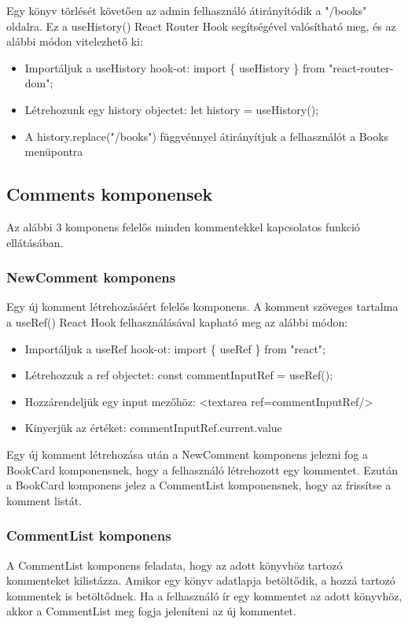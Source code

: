 \bigskip

Egy könyv törlését követően az admin felhasználó átirányítódik a "/books" oldalra. Ez a useHistory() React Router Hook segítségével valósítható meg, és az alábbi módon vitelezhető ki:
\begin{itemize}
    \item Importáljuk a useHistory hook-ot: import \{ useHistory \} from "react-router-dom";
    \item Létrehozunk egy history objectet: let history = useHistory();
    \item A history.replace("/books") függvénnyel átirányítjuk a felhasználót a Books menüpontra
\end{itemize}

\subsection{Comments komponensek}
Az alábbi 3 komponens felelős minden kommentekkel kapcsolatos funkció ellátásában.

\subsubsection{NewComment komponens}
Egy új komment létrehozásáért felelős komponens. A komment szöveges tartalma a useRef() React Hook felhasználásával kapható meg az alábbi módon:
\begin{itemize}
    \item Importáljuk a useRef hook-ot: import \{ useRef \} from "react";
    \item Létrehozzuk a ref objectet: const commentInputRef = useRef();
    \item Hozzárendeljük egy input mezőhöz: <textarea ref={commentInputRef}/>
    \item Kinyerjük az értéket: commentInputRef.current.value
\end{itemize}

Egy új komment létrehozása után a NewComment komponens jelezni fog a BookCard komponensnek, hogy a felhasználó létrehozott egy kommentet. Ezután a BookCard komponens jelez a CommentList komponensnek, hogy az frissítse a komment listát.


\subsubsection{CommentList komponens}
A CommentList komponens feladata, hogy az adott könyvhöz tartozó kommenteket kilistázza. Amikor egy könyv adatlapja betöltődik, a hozzá tartozó kommentek is betöltődnek. Ha a felhasználó ír egy kommentet az adott könyvhöz, akkor a CommentList meg fogja jeleníteni az új kommentet.

